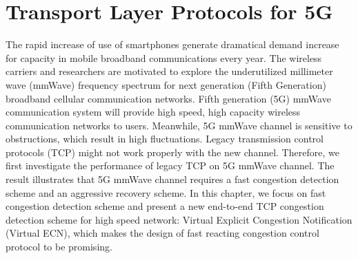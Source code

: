 \chapter{Transport Layer Protocols for 5G}\label{ch:TCP5G} 


\par The rapid increase of use of smartphones generate dramatical demand increase for capacity in mobile broadband communications every year. The wireless carriers and researchers are motivated to explore the underutilized millimeter wave (mmWave) frequency spectrum for next generation (Fifth Generation) broadband cellular communication networks. Fifth generation (5G) mmWave communication system will provide high speed, high capacity wireless communication networks to users. Meanwhile, 5G mmWave channel is sensitive to obstructions, which result in high fluctuations. Legacy transmission control protocols (TCP) might not work properly with the new channel. Therefore, we first investigate the performance of legacy TCP on 5G mmWave channel. The result illustrates that 5G mmWave channel requires a fast congestion detection scheme and an aggressive recovery scheme. In this chapter, we focus on fast congestion detection scheme and present a new end-to-end TCP congestion detection scheme for high speed network: Virtual Explicit Congestion Notification (Virtual ECN), which makes the design of fast reacting congestion control protocol to be promising. 
